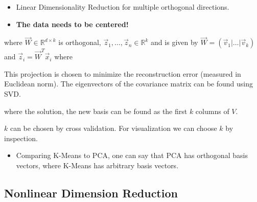 \documentclass[8pt,a4paper]{scrartcl}
\begin{document}
\begin{multicols*}{3}
\begin{itemize}
\ncompaq
\item Linear Dimensionality Reduction for multiple orthogonal directions.
\item \textbf{The data needs to be centered!}

\end{itemize}



where $\vec{W}\in\mathbb{R}^{d\times k}$ is orthogonal, $\vec{z}_1,\ldots,\vec{z}_n\in\mathbb{R}^k$ and is given by $\vec{W}=(\vec{v}_1|\ldots|\vec{v}_k)$ and $\vec{z}_i=\vec{W}^T\vec{x}_i$ where 


This projection is chosen to minimize the reconstruction error (measured in Euclidean norm). The eigenvectors of the covariance matrix can be found using SVD.


where the solution, the new basis can be found as the first $k$ columns of $V$.

\vspace{3ex}

$k$ can be chosen by cross validation. For visualization we can choose $k$ by inspection.

\begin{itemize}
\ncompaq
\item Comparing K-Means to PCA, one can say that PCA has orthogonal basis vectors, where K-Means has arbitrary basis vectors.
\end{itemize}

\subsection{Nonlinear Dimension Reduction}


\end{multicols*}
\end{document}
